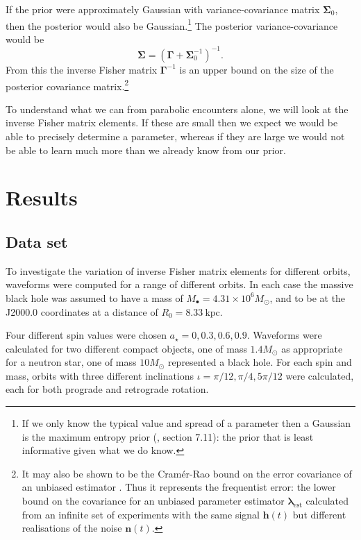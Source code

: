 \documentclass[useAMS,usedcolumn,usegraphicx,usenatbib]{mn2e}
\newcommand{\sub}[1]{\ensuremath{_\mathrm{#1}}}
\begin{document}
If the prior were approximately Gaussian with variance-covariance matrix $\boldsymbol{\Sigma}_0$, then the posterior would also be Gaussian.\footnote{If we only know the typical value and spread of a parameter then a Gaussian is the maximum entropy prior (\citealt{Jaynes2003}, section 7.11): the prior that is least informative given what we do know.} The posterior variance-covariance would be \citep{Cutler1994, Vallisneri2008}
\begin{equation}
\boldsymbol{\Sigma} = \left(\boldsymbol{\Gamma} + \boldsymbol{\Sigma}_0^{-1}\right)^{-1}.
\label{eq:Posterior_variance}
\end{equation}
From this the inverse Fisher matrix $\boldsymbol{\Gamma}^{-1}$ is an upper bound on the size of the posterior covariance matrix.\footnote{It may also be shown to be the Cram\'{e}r-Rao bound on the error covariance of an unbiased estimator \citep{Cutler1994, Vallisneri2008}. Thus it represents the frequentist error: the lower bound on the covariance for an unbiased parameter estimator $\boldsymbol{\lambda}\sub{est}$ calculated from an infinite set of experiments with the same signal $\boldsymbol{h}(t)$ but different realisations of the noise $\boldsymbol{n}(t)$.}

To understand what we can from parabolic encounters alone, we will look at the inverse Fisher matrix elements. If these are small then we expect we would be able to precisely determine a parameter, whereas if they are large we would not be able to learn much more than we already know from our prior.

\section{Results}\label{sec:Results}

\subsection{Data set}

To investigate the variation of inverse Fisher matrix elements for different orbits, waveforms were computed for a range of different orbits. In each case the massive black hole was assumed to have a mass of $M_\bullet = 4.31 \times 10^6 M_\odot$, and to be at the J2000.0 coordinates at a distance of $R_0 = 8.33~\mathrm{kpc}$.

Four different spin values were chosen $a_\star = 0, 0.3, 0.6, 0.9$. Waveforms were calculated for two different compact objects, one of mass $1.4 M_\odot$ as appropriate for a neutron star, one of mass $10 M_\odot$ represented a black hole. For each spin and mass, orbits with three different inclinations $\iota = \pi/12, \pi/4, 5\pi/12$ were calculated, each for both prograde and retrograde rotation.
\end{document}
